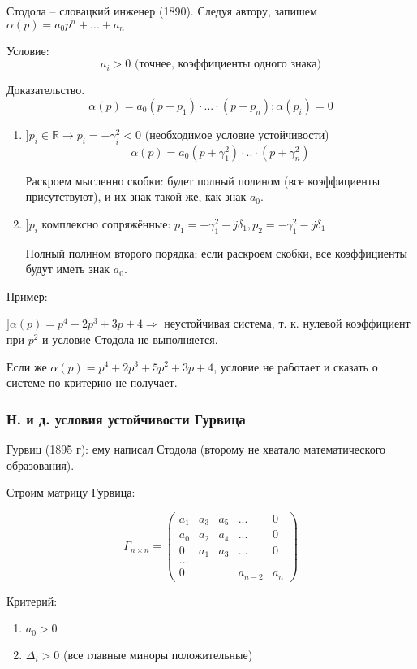 \documentclass[main.tex]{subfiles}
\begin{document}
Стодола -- словацкий инженер (1890).
Следуя автору, запишем $\alpha(p) = a_0 p^n + ... + a_n $

Условие:
$$\boxed{a_i > 0} \text{ (точнее, коэффициенты одного знака)}$$

Доказательство.
$$ \alpha(p) = a_0 (p-p_1) \cdot ... \cdot (p - p_n); \alpha(p_i) = 0 $$

\begin{enumerate}[noitemsep]
	\item $ ] p_i \in \mathds{R} \to p_i = - \gamma_i^2 < 0 $ (необходимое условие устойчивости)
	$$ \alpha(p) = a_0(p+\gamma_1^2) \cdot .. \cdot (p + \gamma_n^2) $$
	
	Раскроем мысленно скобки: будет полный полином (все коэффициенты присутствуют), и их знак такой же, как знак $a_0$. 
	\item $ ] p_i \text{ комплексно сопряжённые: } p_1 = - \gamma_1^2 + j \delta_1, p_2 = - \gamma_1^2 - j \delta_1  $
	
	Полный полином второго порядка; если раскроем скобки, все коэффициенты будут иметь знак $a_0$.
\end{enumerate}

Пример:

$ ] \alpha(p) = p^4 + 2 p^3 + 3p + 4 \Rightarrow $ неустойчивая система, т. к. нулевой коэффициент при $ p^2 $ и условие Стодола не выполняется.

Если же $ \alpha(p) = p^4 + 2 p^3 + 5 p^2 + 3p + 4 $, условие не работает и сказать о системе по критерию не получает.

\subsubsection{Н. и д. условия устойчивости Гурвица}

Гурвиц (1895 г): ему написал Стодола (второму не хватало математического образования).

Строим матрицу Гурвица:

$$ \Gamma_{n \times n} = \begin{pmatrix}
a_1 &  a_3 & a_5 & ... & 0 \\
a_0 &  a_2 & a_4 & ... & 0 \\
0   &  a_1 & a_3 & ... & 0 \\
... &&&& \\
0  &&& a_{n-2} & a_n
\end{pmatrix} $$

Критерий:

\begin{enumerate}[noitemsep]
	\item $ a_0 > 0 $
	\item $ \Delta_i > 0 $ (все главные миноры положительные)
\end{enumerate}
\end{document}
